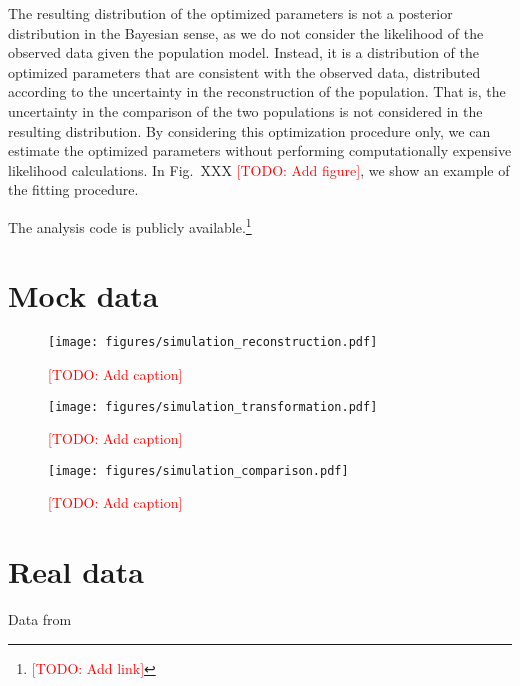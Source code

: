 \documentclass[aps,prd,twocolumn,superscriptaddress,preprintnumbers,nofootinbib,hidelinks]{revtex4-2}
\newcommand{\todo}[1]{\textcolor{red}{[TODO: #1]}}
\begin{document}
The resulting distribution of the optimized parameters is not a posterior distribution in the Bayesian sense, as we do not consider the likelihood of the observed data given the population model.
Instead, it is a distribution of the optimized parameters that are consistent with the observed data, distributed according to the uncertainty in the reconstruction of the population.
That is, the uncertainty in the comparison of the two populations is not considered in the resulting distribution.
By considering this optimization procedure only, we can estimate the optimized parameters without performing computationally expensive likelihood calculations.
In Fig.~XXX \todo{Add figure}, we show an example of the fitting procedure.

The analysis code is publicly available.\footnote{\todo{Add link}}

\section{Mock data}
\label{sec:mock_data}

\begin{figure}[h]
    \texttt{[image: figures/simulation\_reconstruction.pdf]}
    \caption{
        \todo{Add caption}
    }
    \label{fig:simulation_reconstruction}
\end{figure}

\begin{figure}[h]
    \texttt{[image: figures/simulation\_transformation.pdf]}
    \caption{
        \todo{Add caption}
    }
    \label{fig:simulation_transformation}
\end{figure}

\begin{figure}[h]
    \texttt{[image: figures/simulation\_comparison.pdf]}
    \caption{
        \todo{Add caption}
    }
    \label{fig:simulation_comparison}
\end{figure}


\section{Real data}
\label{sec:real_data}

Data from \citet{LIGOScientific:2019lzm, KAGRA:2023pio}
\end{document}
